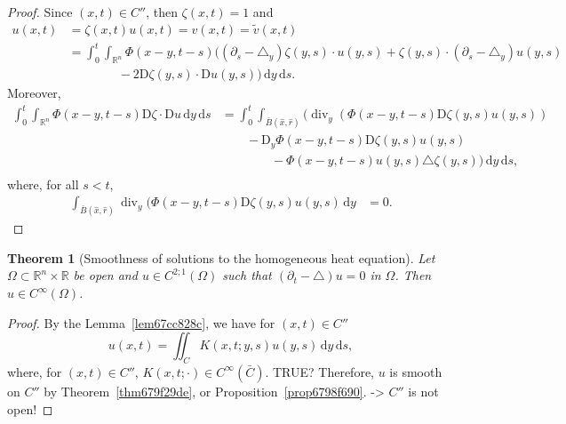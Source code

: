 \documentclass[a4paper,9pt]{amsart}
\newcommand{\R}{\mathbb{R}}	%
\newcommand{\did}{\,\mathrm{d}}	%
\newcommand{\de}{\partial}		%
\newcommand{\Diff}{\mathrm{D}}
\renewcommand{\div}{\operatorname{div}}	%
\newcommand{\spt}{\mathrm{spt}}
\newcommand{\laplacian}{\triangle}
\theoremstyle{plain}
\newtheorem{theorem}[proposition]{Theorem}
\theoremstyle{definition}
\theoremstyle{remark}
\begin{document}
{\begin{proof}
	Since $(x,t)\in C''$, then $\zeta(x,t)=1$ and
	\begin{align*}
	u(x,t) 
	&= \zeta(x,t) u(x,t)
	= v(x,t)
	= \tilde v(x,t) \\
	&= \int_0^t \int_{\R^n} \Phi(x-y,t-s) \bigg(
	(\de_s-\laplacian_y)\zeta(y,s)\cdot u(y,s) + \zeta(y,s)\cdot (\de_s-\laplacian_y)u(y,s) 
	\\&\qquad\qquad
	- 2 \Diff\zeta(y,s)\cdot\Diff u(y,s)
	\bigg) \did y\did s .
	\end{align*}
	Moreover,
	\begin{align*}
	\int_0^t\int_{\R^n} \Phi(x-y,t-s) \Diff\zeta\cdot\Diff u \did y\did s
	&= \int_0^t \int_{\bar B(\hat x,\hat r)}
		\bigg( \div_y( \Phi(x-y,t-s) \Diff\zeta(y,s) u(y,s) ) \\
	&\qquad		- \Diff_y\Phi(x-y,t-s) \Diff\zeta(y,s) u(y,s) \\
	&\qquad\qquad		- \Phi(x-y,t-s) u(y,s) \laplacian\zeta(y,s) 
		\bigg) \did y\did s ,\\
	\end{align*}
	where, for all $s<t$,
	\begin{align*}
	 	\int_{\bar B(\hat x,\hat r)} \div_y( \Phi(x-y,t-s) \Diff\zeta(y,s) u(y,s) \did y 
		&= 0 .
	\end{align*}
\end{proof}

\begin{theorem}[Smoothness of solutions to the homogeneous heat equation]\label{thm67cc8194}
	Let $\Omega\subset\R^n\times\R$ be open and $u\in C^{2;1}(\Omega)$ such that
	$(\de_t-\laplacian)u=0$ in $\Omega$.
	Then $u\in C^\infty(\Omega)$.
\end{theorem}
\begin{proof}
	By the Lemma~\ref{lem67cc828c}, we have for $(x,t)\in C''$
	\begin{equation}
		u(x,t) = \iint_C K(x,t;y,s) u(y,s) \did y\did s ,
	\end{equation}
	where, for $(x,t)\in C''$, $K(x,t;\cdot)\in C^\infty(\bar C)$.
	{\color{Red} TRUE? Therefore, $u$ is smooth on $C''$ by Theorem~\ref{thm679f29de}, or Proposition~\ref{prop6798f690}. -> $C''$ is not open!}
\end{proof}

}
\end{document}
